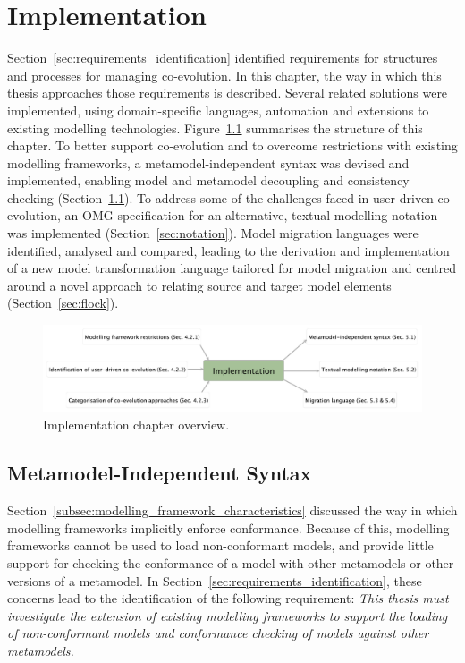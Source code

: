 
\chapter{Implementation}
\label{Implementation}
Section~\ref{sec:requirements_identification} identified requirements for structures and processes for managing co-evolution. In this chapter, the way in which this thesis approaches those requirements is described. Several related solutions were implemented, using domain-specific languages, automation and extensions to existing modelling technologies. Figure~\ref{fig:implementation_overview} summarises the structure of this chapter. To better support co-evolution and to overcome restrictions with existing modelling frameworks, a metamodel-independent syntax was devised and implemented, enabling model and metamodel decoupling and consistency checking (Section~\ref{sec:mmi_syntax}). To address some of the challenges faced in user-driven co-evolution, an OMG specification for an alternative, textual modelling notation was implemented (Section~\ref{sec:notation}). Model migration languages were identified, analysed and compared, leading to the derivation and implementation of a new model transformation language tailored for model migration and centred around a novel approach to relating source and target model elements (Section~\ref{sec:flock}). 

\begin{figure}[htbp]
  \begin{center}
    \leavevmode
    \includegraphics[scale=0.66]{5.Implementation/overview.pdf}
  \end{center}
  \caption{Implementation chapter overview.}
  \label{fig:implementation_overview}
\end{figure}


\section{Metamodel-Independent Syntax}
\label{sec:mmi_syntax}
Section~\ref{subsec:modelling_framework_characteristics} discussed the way in which modelling frameworks implicitly enforce conformance. Because of this, modelling frameworks cannot be used to load non-conformant models, and provide little support for checking the conformance of a model with other metamodels or other versions of a metamodel. In Section~\ref{sec:requirements_identification}, these concerns lead to the identification of the following requirement: \emph{This thesis must investigate the extension of existing modelling frameworks to support the loading of non-conformant models and conformance checking of models against other metamodels.}

